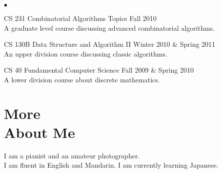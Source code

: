 \documentclass[margin,line]{res}
\newenvironment{list2}{
  \begin{list}{$\bullet$}{%
      \setlength{\itemsep}{0in}
      \setlength{\parsep}{0in} \setlength{\parskip}{0in}
      \setlength{\topsep}{0in} \setlength{\partopsep}{0in}
      \setlength{\leftmargin}{0.2in}}}{\end{list}}
\begin{document}
\begin{resume}
\begin{list2}
\item {CS 231 Combinatorial Algorithms Topics} \hfill {Fall 2010}\\
A graduate level course discussing advanced combinatorial algorithms.

\item {CS 130B Data Structure and Algorithm II} \hfill {Winter 2010 \& Spring 2011}\\
An upper division course discussing classic algorithms.

\item {CS 40 Fundamental Computer Science} \hfill {Fall 2009 \& Spring 2010}\\
A lower division course about discrete mathematics.
\end{list2}

\section{\sc More \\About Me}
I am a pianist and an amateur photographer.\\
I am fluent in English and Mandarin. I am currently learning Japanese.

\end{resume}
\end{document}
